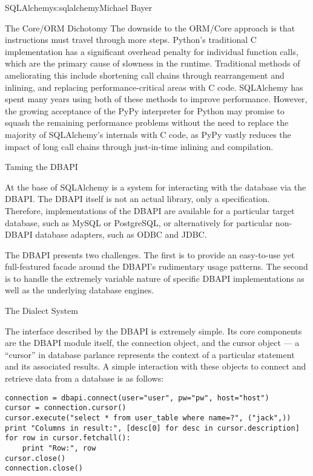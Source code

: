 \begin{aosachapter}{SQLAlchemy}{s:sqlalchemy}{Michael Bayer}
\begin{aosasect1}{The Core/ORM Dichotomy}
The downside to the ORM/Core approach is that instructions must
travel through more steps.  Python's
traditional C implementation has a significant overhead penalty
for individual function calls, which are the primary cause
of slowness in the runtime.  Traditional methods of ameliorating
this include shortening call chains through rearrangement
and inlining, and replacing performance-critical areas with C code.
SQLAlchemy has spent many years using both of these methods to
improve performance.   However, the growing acceptance of the
PyPy interpreter for Python may promise to squash the remaining
performance problems without the need to replace the majority of
SQLAlchemy's internals with C code, as PyPy vastly
reduces the impact of long call chains through just-in-time
inlining and compilation.

\end{aosasect1}

\begin{aosasect1}{Taming the DBAPI}

At the base of SQLAlchemy is a system for interacting with the database via
the DBAPI.  The DBAPI itself is not an actual library, only
a specification. Therefore, implementations of the DBAPI are available for a
particular target database, such as MySQL or PostgreSQL, or alternatively
for particular non-DBAPI database adapters, such as ODBC and JDBC.

The DBAPI presents two challenges.  The first is to provide an
easy-to-use yet full-featured facade around the DBAPI's rudimentary
usage patterns.  The second is to handle the extremely variable nature of
specific DBAPI implementations as well as the underlying database engines.

\begin{aosasect2}{The Dialect System}

The interface described by the DBAPI is extremely simple. Its core components
are the DBAPI module itself, the connection object, and the cursor
object — a ``cursor'' in database parlance represents the context of a
particular statement and its associated results.  A simple interaction with these
objects to connect and retrieve data from a database is as follows:

\begin{verbatim}
connection = dbapi.connect(user="user", pw="pw", host="host")
cursor = connection.cursor()
cursor.execute("select * from user_table where name=?", ("jack",))
print "Columns in result:", [desc[0] for desc in cursor.description]
for row in cursor.fetchall():
    print "Row:", row
cursor.close()
connection.close()
\end{verbatim}


\end{aosasect2}
\end{aosasect1}
\end{aosachapter}
